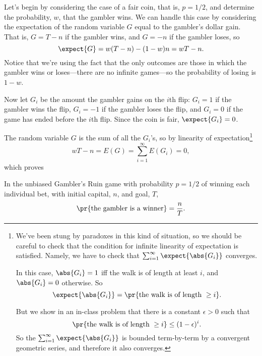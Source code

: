 
\begin{pcomments}
\end{pcomments}



\begin{problem}
Let's begin by considering the case of a fair coin, that is, $p = 1/2$, and
determine the probability, $w$, that the gambler wins.  We can handle this
case by considering the expectation of the random variable $G$ equal to the
gambler's dollar gain.  That is, $G = T-n$ if the gambler wins, and $G= -n$
if the gambler loses, so
\[
\expect{G} = w(T-n) - (1-w)n = wT - n.
\]
Notice that we're using the fact that the only outcomes are those in
which the gambler wins or loses---there are no infinite games---so
the probability of losing is $1-w$.

Now let $G_{i}$ be the amount the gambler gains on the $i$th flip:
$G_{i}=1$ if the gambler wins the flip, $G_{i}=-1$ if the gambler loses
the flip, and $G_{i}=0$ if the game has ended before the $i$th flip.
Since the coin is fair, $\expect{G_{i}}=0$.

The random variable $G$ is the sum of all the $G_{i}$'s, so by linearity of
expectation\footnote{We've been stung by paradoxes in this kind of
situation, so we should be careful to check that the condition for infinite
linearity of expectation is satisfied.  Namely, we have to check that
$\sum_{i=1}^\infty \expect{\abs{G_i}}$ converges.

In this case, $\abs{G_i} = 1$ iff the walk is of length at least $i$, and
$\abs{G_i} = 0$ otherwise.  So
\[
\expect{\abs{G_i}} = \pr{\text{the walk is of length } \geq i}.
\]

But we show in an in-class problem that there is a constant $\epsilon >0$
such that
\[
\pr{\text{the walk is of length } \geq i} \leq (1 - \epsilon)^i.
\]
So the $\sum_{i=1}^\infty \expect{\abs{G_i}}$ is bounded term-by-term by a
convergent geometric series, and therefore it also converges.}
\[
wT - n= E(G) = \sum_{i=1}^{\infty}E(G_{i}) = 0,
\]
which proves
\begin{theorem}\label{fairwinthm}
In the unbiased Gambler's Ruin game with probability $p=1/2$ of winning
each individual bet, with initial capital, $n$, and goal, $T$,
\begin{equation}\label{fairwin}
\pr{\text{the gambler is a winner}} = \frac{n}{T}.
\end{equation}
\end{theorem}
\end{problem}



\endinput
